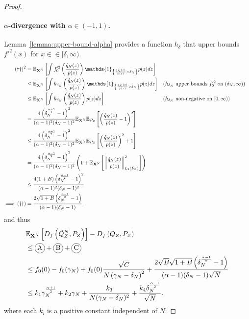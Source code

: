 \begin{proof}
\paragraph{$\alpha$-divergence with $\alpha\in(-1,1)$.}
Lemma~\ref{lemma:upper-bound-alpha} provides a function $h_\delta$ that upper bounds $f'^2(x)$ for $x \in \in[\delta, \infty)$.
%
\begin{align*}
    (\dagger\dagger)^2 
    &= \E_{\XN} \left[\int f_0'^2\left(\frac{\hat{q}_N(z)}{p(z)} \right) \mathds{1}_{\left\lbrace \frac{\hat{q}_N(z)}{p(z)} > \delta_N \right\rbrace} p(z) dz \right]
    \\
    &\leq \E_{\XN} \left[\int h_{\delta_N}\left(\frac{\hat{q}_N(z)}{p(z)} \right) \mathds{1}_{\left\lbrace \frac{\hat{q}_N(z)}{p(z)} > \delta_N \right\rbrace} p(z) dz \right]
    && \text{($h_{\delta_N}$ upper bounds $f_0'^2$ on $(\delta_N, \infty)$)}
    \\
    &\leq \E_{\XN} \left[\int h_{\delta_N}\left(\frac{\hat{q}_N(z)}{p(z)} \right) p(z) dz \right]
    && \text{($h_{\delta_N}$ non-negative on $[0, \infty)$)}
    \\
    &= \frac{4\left(\delta_N^\frac{\alpha-1}{2} - 1\right)^2}{(\alpha - 1)^2 (\delta_N- 1)^2} \E_{\XN}\E_{P_Z} \left[ \left(\frac{\hat{q}_N(z)}{p(z)} - 1 \right)^2 \right] \\
    &\leq \frac{4\left(\delta_N^\frac{\alpha-1}{2} - 1\right)^2}{(\alpha - 1)^2 (\delta_N- 1)^2} \E_{\XN}\E_{P_Z} \left[ \left(\frac{\hat{q}_N(z)}{p(z)}\right)^2 + 1 \right] \\
    &= \frac{4\left(\delta_N^\frac{\alpha-1}{2} - 1\right)^2}{(\alpha - 1)^2 (\delta_N- 1)^2}\left( 1 +  \E_{\XN}\left[ \left\| \frac{\hat{q}_N(z)}{p(z)}\right\|^2_{L_2(P_Z)} \right] \right)\\
    &\leq \frac{4(1+B)\left(\delta_N^\frac{\alpha-1}{2} - 1\right)^2}{(\alpha - 1)^2 (\delta_N- 1)^2} \\
    \implies (\dagger\dagger)&= \frac{2\sqrt{1+B}\left(\delta_N^\frac{\alpha-1}{2} - 1\right)}{(\alpha - 1) (\delta_N- 1)}.
\end{align*}
%
and thus
%
\begin{align*}
    &\E_{\XN} \left[ D_f\left( \hat{Q}_Z^N , P_Z\right)\right] - D_f\left( Q_{Z} , P_Z\right)\\
    &\leq \encircle{A} + \encircle{B} + \encircle{C} \\
    &\leq f_0(0) - f_0(\gamma_N) + f_0(0) \frac{\sqrt{C}}{N \left( \gamma_N - \delta_N \right)^2} + \frac{2\sqrt{B}\sqrt{1+B}\left(\delta_N^\frac{\alpha-1}{2} - 1\right)}{(\alpha - 1) (\delta_N- 1) \sqrt{N}}\\
    &\leq k_1 \gamma_N^{\frac{\alpha+1}{2}} + k_2 \gamma_N + \frac{k_3}{N(\gamma_N - \delta_N)^2} + \frac{k_4 \delta_N^\frac{\alpha-1}{2}}{\sqrt{N}}.
\end{align*}
where each $k_i$ is a positive constant independent of $N$.


\end{proof}
